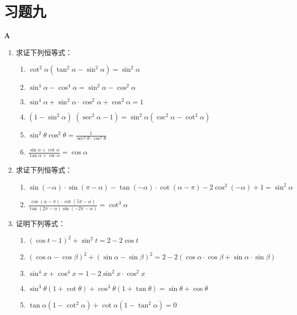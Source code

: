\section*{习题九}
\begin{center}
    \bfseries A
\end{center}
\begin{enumerate}
\item 求证下列恒等式：
\begin{enumerate}[(1)]
    \item $\cot^2\alpha(\tan^2\alpha-\sin^2\alpha)=\sin^2\alpha$
    \item $\sin^4\alpha-\cos^4\alpha=\sin^2\alpha-\cos^2\alpha$
    \item $\sin^4\alpha+\sin^2\alpha\cdot \cos^2\alpha+\cos^2\alpha=1$
    \item $( 1- \sin ^{2}\alpha )$ $( \sec ^{2}\alpha - 1) = \sin ^{2}\alpha \left ( \csc ^{2}\alpha - \cot ^{2}\alpha \right )$
    \item $\sin^{2}\theta\cos^{2}\theta=\frac{1}{\sec^{2}\theta\cdot\csc^{2}\theta}$
    \item $\frac{\sin\alpha+\cot\alpha}{\tan\alpha+\csc\alpha}=\cos\alpha$
\end{enumerate}

\item 求证下列恒等式：
\begin{enumerate}[(1)]
    \item $\sin(-\alpha)\cdot \sin(\pi-\alpha)-\tan(-\alpha)\cdot \cot(\alpha-\pi)-2\cos^2(-\alpha)+1=\sin^2\alpha$
    \item $\frac{\cos(\alpha-\pi)\cdot \cot(5\pi-\alpha)}{\tan(2\pi-\alpha)\sin(-2\pi-\alpha)}=\cot^3\alpha$
\end{enumerate}

\item 证明下列等式：
\begin{enumerate}[(1)]
    \item $(\cos t-1)^2+\sin^2 t=2-2\cos t$
    \item $(\cos\alpha-\cos\beta)^2+(\sin\alpha-\sin\beta)^2=2-2(\cos\alpha\cdot \cos\beta+\sin\alpha\cdot \sin\beta)$
    \item $\sin^4 x+\cos^4 x=1-2\sin^2x\cdot \cos^2 x$
    \item $\sin^3\theta(1+\cot\theta)+\cos^3\theta(1+\tan\theta)=\sin\theta+\cos\theta$
    \item $\tan\alpha(1-\cot^2\alpha)+\cot\alpha(1-\tan^2\alpha)=0$
\end{enumerate}
\end{enumerate}

